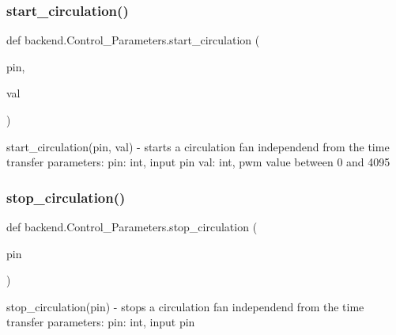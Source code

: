 \subsubsection{\texorpdfstring{start\+\_\+circulation()}{start\_circulation()}}
{\footnotesize\ttfamily def backend.\+Control\+\_\+\+Parameters.\+start\+\_\+circulation (\begin{DoxyParamCaption}\item[{}]{pin,  }\item[{}]{val }\end{DoxyParamCaption})}

\begin{DoxyVerb}start_circulation(pin, val)
    - starts a circulation fan independend from the time
transfer parameters:
    pin: int, input pin
    val: int, pwm value between 0 and 4095
\end{DoxyVerb}
 \mbox{\label{classbackend_1_1Control__Parameters_a0ebe83ac5e2dea477f1971ab9e66cb23_a0ebe83ac5e2dea477f1971ab9e66cb23}} 
\subsubsection{\texorpdfstring{stop\+\_\+circulation()}{stop\_circulation()}}
{\footnotesize\ttfamily def backend.\+Control\+\_\+\+Parameters.\+stop\+\_\+circulation (\begin{DoxyParamCaption}\item[{}]{pin }\end{DoxyParamCaption})}

\begin{DoxyVerb}stop_circulation(pin)
    - stops a circulation fan independend from the time
transfer parameters:
    pin: int, input pin
\end{DoxyVerb}
 \mbox{\label{classbackend_1_1Control__Parameters_ac0ea3fa0e5b78766667cd717f7dd03e1_ac0ea3fa0e5b78766667cd717f7dd03e1}} 
